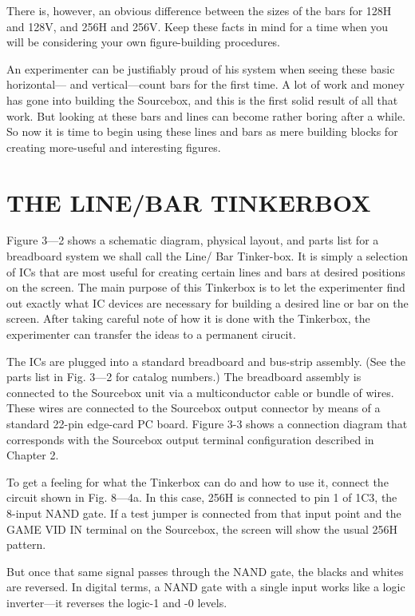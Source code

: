 \documentclass[11pt]{book}              %
\begin{document}
There is, however, an obvious difference between the sizes of the bars for 128H and 128V, and 256H and 256V. Keep these facts in mind for a time when you will be considering your own figure-building procedures.

An experimenter can be justifiably proud of his system when seeing these basic horizontal— and vertical—count bars for the first time. A lot of work and money has gone into building the Sourcebox, and this is the first solid result of all that work. But looking at these bars and lines can become rather boring after a while. So now it is time to begin using these lines and bars as mere building blocks for creating more-useful and interesting figures.

\section{THE LINE/BAR TINKERBOX}

Figure 3—2 shows a schematic diagram, physical layout, and parts list for a breadboard system we shall call the Line/ Bar Tinker-box. It is simply a selection of ICs that are most useful for creating certain lines and bars at desired positions on the screen. The main purpose of this Tinkerbox is to let the experimenter find out exactly what IC devices are necessary for building a desired line or bar on the screen. After taking careful note of how it is done with the Tinkerbox, the experimenter can transfer the ideas to a permanent cirucit.

The ICs are plugged into a standard breadboard and bus-strip assembly. (See the parts list in Fig. 3—2 for catalog numbers.) The breadboard assembly is connected to the Sourcebox unit via a multiconductor cable or bundle of wires. These wires are connected to the Sourcebox output connector by means of a standard 22-pin edge-card PC board. Figure 3-3 shows a connection diagram that corresponds with the Sourcebox output terminal configuration described in Chapter 2.


To get a feeling for what the Tinkerbox can do and how to use it, connect the circuit shown in Fig. 8—4a. In this case, 256H is connected to pin 1 of 1C3, the 8-input NAND gate. If a test jumper is connected from that input point and the GAME VID IN terminal on the Sourcebox, the screen will show the usual 256H pattern.

But once that same signal passes through the NAND gate, the blacks and whites are reversed. In digital terms, a NAND gate with a single input works like a logic inverter—it reverses the logic-1 and -0 levels.
\end{document}
